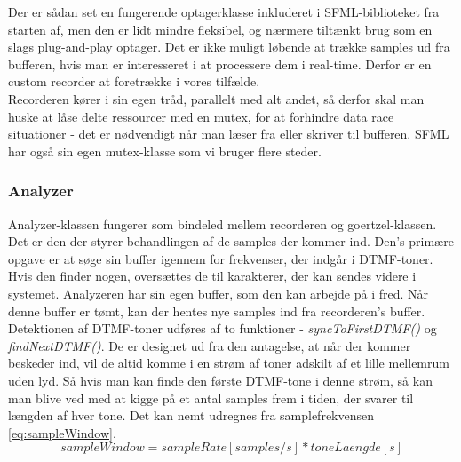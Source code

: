 Der er sådan set en fungerende optagerklasse inkluderet i SFML-biblioteket fra starten af, men den er lidt mindre fleksibel, og nærmere tiltænkt brug som en slags plug-and-play optager. Det er ikke muligt løbende at trække samples ud fra bufferen, hvis man er interesseret i at processere dem i real-time. Derfor er en custom recorder at foretrække i vores tilfælde. \\
Recorderen kører i sin egen tråd, parallelt med alt andet, så derfor skal man huske at låse delte ressourcer med en mutex, for at forhindre data race situationer - det er nødvendigt når man læser fra eller skriver til bufferen. SFML har også sin egen mutex-klasse som vi bruger flere steder.

\subsubsection{Analyzer}

Analyzer-klassen fungerer som bindeled mellem recorderen og goertzel-klassen. Det er den der styrer behandlingen af de samples der kommer ind. Den's primære opgave er at søge sin buffer igennem for frekvenser, der indgår i DTMF-toner. Hvis den finder nogen, oversættes de til karakterer, der kan sendes videre i systemet. Analyzeren har sin egen buffer, som den kan arbejde på i fred. Når denne buffer er tømt, kan der hentes nye samples ind fra recorderen's buffer. \\

Detektionen af DTMF-toner udføres af to funktioner - \textit{syncToFirstDTMF()} og \textit{findNextDTMF()}. De er designet ud fra den antagelse, at når der kommer beskeder ind, vil de altid komme i en strøm af toner adskilt af et lille mellemrum uden lyd. Så hvis man kan finde den første DTMF-tone i denne strøm, så kan man blive ved med at kigge på et antal samples frem i tiden, der svarer til længden af hver tone. Det kan nemt udregnes fra samplefrekvensen \eqref{eq:sampleWindow}. \\

\begin{equation}
sampleWindow=sampleRate[samples/s]*toneLaengde[s]
\label{eq:sampleWindow}
\end{equation}

